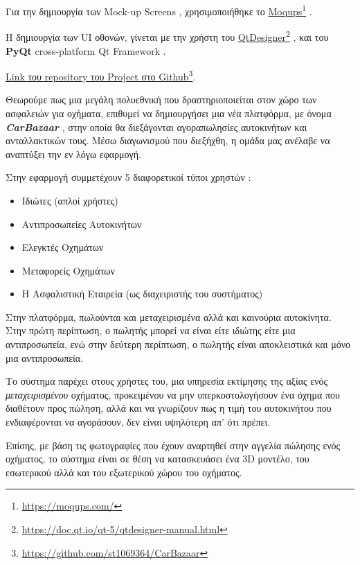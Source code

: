 \documentclass{../ol-softwaremanual}
\newcommand{\doclink}[2]{\href{#1}{#2}\footnote{\url{#1}}}
\begin{document}
	Για την δημιουργία των \en Mock-up Screens \gr, χρησιμοποιήθηκε το \en \doclink{https://moqups.com/}{Moqups} \gr . \break
	
	Η δημιουργία των \en UI \gr οθονών, γίνεται με την χρήστη του \en \doclink{https://doc.qt.io/qt-5/qtdesigner-manual.html}{QtDesigner} \gr, και του  \en \textbf{PyQt} cross-platform Qt Framework \gr. \break
	
	\en 	\doclink{https://github.com/st1069364/CarBazaar}{Link \gr του \en  repository \gr του \en Project \gr στο \en Github}. \gr
	
	\newpage
	
	
	\vspace{10pt}
	
	\flushleft
	
	Θεωρούμε πως μια μεγάλη πολυεθνική που δραστηριοποιείται στον χώρο των ασφαλειών για οχήματα, επιθυμεί να δημιουργήσει μια νέα πλατφόρμα, με όνομα  \en \textbf{\textit{CarBazaar}} \gr, στην οποία θα διεξάγονται αγοραπωλησίες αυτοκινήτων και ανταλλακτικών τους. Μέσω διαγωνισμού που διεξήχθη, η ομάδα μας ανέλαβε να αναπτύξει την εν λόγω εφαρμογή. \break
	
	Στην εφαρμογή συμμετέχουν 5 διαφορετικοί τύποι χρηστών :
	
	\begin{itemize}
		\item Ιδιώτες (απλοί χρήστες)
		\item Αντιπροσωπείες Αυτοκινήτων
		\item Ελεγκτές Οχημάτων
		\item Μεταφορείς Οχημάτων
		\item Η Ασφαλιστική Εταιρεία (ως διαχειριστής του συστήματος)
	\end{itemize}
	
	Στην πλατφόρμα, πωλούνται και μεταχειρισμένα αλλά και καινούρια αυτοκίνητα. Στην πρώτη περίπτωση, ο πωλητής μπορεί να είναι είτε ιδιώτης είτε μια αντιπροσωπεία, ενώ στην δεύτερη περίπτωση, ο πωλητής είναι αποκλειστικά και μόνο μια αντιπροσωπεία.  \break	
	
	Το σύστημα παρέχει στους χρήστες του, μια υπηρεσία εκτίμησης της αξίας ενός \textit{μεταχειρισμένου} οχήματος, προκειμένου να μην υπερκοστολογήσουν ένα όχημα που διαθέτουν προς πώληση, αλλά και να γνωρίζουν πως η τιμή του αυτοκινήτου που ενδιαφέρονται να αγοράσουν, δεν είναι υψηλότερη απ' ότι πρέπει. \break
	
	Επίσης, με βάση τις φωτογραφίες που έχουν αναρτηθεί στην αγγελία πώλησης ενός οχήματος, το σύστημα είναι σε θέση να κατασκευάσει ένα 3\en D \gr μοντέλο, του εσωτερικού αλλά και του εξωτερικού χώρου του οχήματος. \break
	
\end{document}
